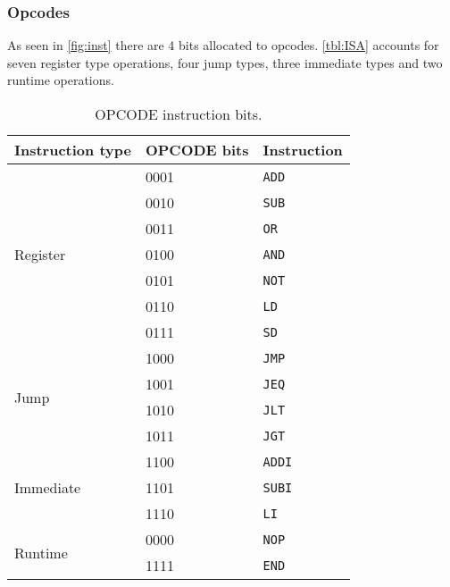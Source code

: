 \documentclass[a4paper, english]{article}
\numberwithin{equation}{section}
\begin{document}
\subsubsection{Opcodes}
As seen in \cref{fig:inst} there are 4 bits allocated to opcodes. \cref{tbl:ISA} accounts for seven register type operations, four jump types, three immediate types and two runtime operations.
\begin{table}[H]
    \centering
    \caption{OPCODE instruction bits.}\label{tbl:opcode}
    \begin{tabular}{lll}
        \toprule
        Instruction type           & OPCODE bits & Instruction   \\
        \midrule
        \multirow{7}{*}{Register}  & 0001       & \texttt{ADD}  \\
                                   & 0010       & \texttt{SUB}  \\
                                   & 0011       & \texttt{OR}   \\
                                   & 0100       & \texttt{AND}  \\
                                   & 0101       & \texttt{NOT}  \\
                                   & 0110       & \texttt{LD}   \\
                                   & 0111       & \texttt{SD}   \\
        \midrule
        \multirow{4}{*}{Jump}      & 1000       & \texttt{JMP}  \\
                                   & 1001       & \texttt{JEQ}  \\
                                   & 1010       & \texttt{JLT}  \\
                                   & 1011       & \texttt{JGT}  \\
        \midrule
        \multirow{3}{*}{Immediate} & 1100       & \texttt{ADDI} \\
                                   & 1101       & \texttt{SUBI} \\
                                   & 1110       & \texttt{LI}   \\
        \midrule
        \multirow{2}{*}{Runtime}   & 0000       & \texttt{NOP}  \\
                                   & 1111       & \texttt{END}  \\
        \bottomrule
    \end{tabular}
\end{table}
\end{document}
